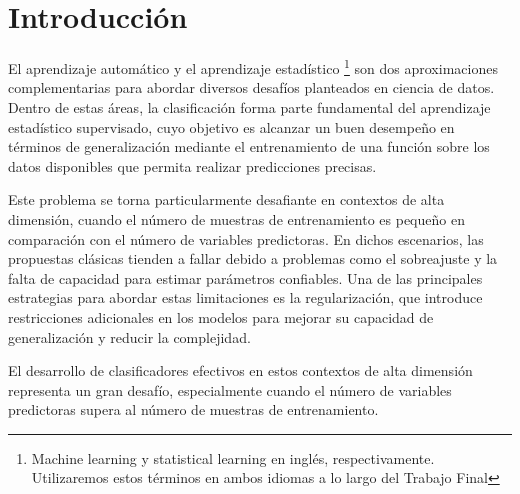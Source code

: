 \documentclass{report}
\begin{document}
		
		
		\newpage
		\thispagestyle{empty}
		\pagestyle{plain}
		\tableofcontents
		
		\newpage
		\thispagestyle{empty}
		\newpage
		\thispagestyle{empty} \cleardoublepage
		
		\pagestyle{myheadings}
		
		
		
		
		\newpage
		\thispagestyle{empty}
		
		\pagestyle{plain}
		\listoffigures 
		\listoftables 
		
		
		
		\newpage
		\thispagestyle{empty}
		\newpage
		\thispagestyle{empty} \cleardoublepage
		
		\pagestyle{myheadings}
		\setcounter{page}{1}
		

\chapter*{Introducción}

El aprendizaje automático  y el aprendizaje estadístico \footnote{Machine learning y statistical learning en inglés, respectivamente. Utilizaremos estos términos en ambos idiomas a lo largo del Trabajo Final} son dos aproximaciones complementarias para abordar diversos desafíos planteados en ciencia de datos. 
Dentro de estas áreas, la clasificación forma parte fundamental del aprendizaje estadístico supervisado, cuyo objetivo es alcanzar un buen desempeño en términos de generalización mediante el entrenamiento de una función sobre los datos disponibles que permita realizar predicciones precisas.

Este problema se torna particularmente desafiante en contextos de alta dimensión, cuando el número de muestras de entrenamiento es pequeño en comparación con el número de variables predictoras. En dichos escenarios, las propuestas clásicas tienden a fallar debido a problemas como el sobreajuste y la falta de capacidad para estimar parámetros confiables. Una de las principales estrategias para abordar estas limitaciones es la regularización, que introduce restricciones adicionales en los modelos para mejorar su capacidad de generalización y reducir la complejidad.

El desarrollo de clasificadores efectivos en estos contextos de alta dimensión representa un gran desafío, especialmente cuando el número de variables predictoras supera al número de muestras de entrenamiento.
\end{document}
